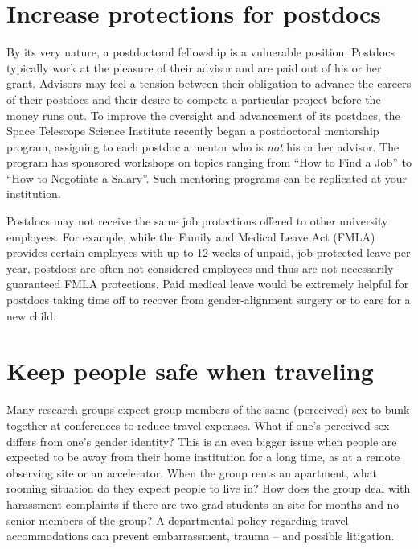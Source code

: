 \section {Increase protections for postdocs}
\label{post-docs}

By its very nature, a postdoctoral fellowship is a vulnerable position.  Postdocs typically work at the pleasure of their advisor and are paid out of his or her grant.  Advisors may feel a tension between their obligation to advance the careers of their postdocs and their desire to compete a particular project before the money runs out.  To improve the oversight and advancement of its postdocs, the Space Telescope Science Institute recently began a postdoctoral mentorship program, assigning to each postdoc a mentor who is \emph{not} his or her advisor.  The program has sponsored workshops on topics ranging from ``How to Find a Job'' to ``How to Negotiate a Salary''.  Such mentoring programs can be replicated at your institution.

Postdocs may not receive the same job protections offered to other university employees.  For example, while the Family and Medical Leave Act (FMLA) provides certain employees with up to 12 weeks of unpaid, job-protected leave per year, postdocs are often not considered employees and thus are not necessarily guaranteed FMLA protections.  Paid medical leave would be extremely helpful for postdocs taking time off to recover from gender-alignment surgery or to care for a new child.

\newpage
\section {Keep people safe when traveling}
\label{accommodations}
Many research groups expect group members of the same (perceived) sex to bunk together at conferences to reduce travel expenses.  What if one's perceived sex differs from one's gender identity?  This is an even bigger issue when people are expected to be away from their home institution for a long time, as at a remote observing site or an accelerator. When the group rents an apartment, what rooming situation do they expect people to live in? How does the group deal with harassment complaints if there are two grad students on site for months and no senior members of the group?  A departmental policy regarding travel accommodations can prevent embarrassment, trauma -- and possible litigation.















